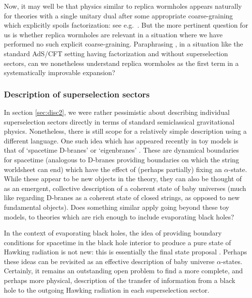 \documentclass[letterpaper,12pt]{article}
\begin{document}
Now, it may well be that physics similar to replica wormholes appears naturally for theories with a single unitary dual after some appropriate coarse-graining which explicitly spoils factorization: see e.g.\ \cite{Pollack:2020gfa,Liu:2020jsv,VanRaamsdonk:2020tlr}. But the more pertinent question for us is whether replica wormholes are relevant in a situation where we have performed no such explicit coarse-graining. Paraphrasing \cite{Stanford:2020wkf}, in a situation like the standard AdS/CFT setting having factorization and without superselection sectors, can we nonetheless understand replica wormholes as the first term in a systematically improvable expansion?

\subsubsection{Description of superselection sectors}
\label{sec:ebranes}

In section \ref{sec:disc2}, we were rather pessimistic about describing individual superselection sectors directly in terms of standard semiclassical gravitational physics. Nonetheless, there is still scope for a relatively simple description using a different language. One such idea which has appeared recently in toy models is that of `spacetime D-branes' or  `eigenbranes' \cite{Blommaert:2019wfy,Blommaert:2020seb,Saad:2019lba,Marolf:2020xie}. These are dynamical boundaries for spacetime (analogous to D-branes providing boundaries on which the string worldsheet can end) which have the effect of (perhaps partially) fixing an $\alpha$-state. While these appear to be new objects in the theory, they can also be thought of as an emergent, collective description of a coherent state of baby universes (much like regarding D-branes as a coherent state of closed strings, as opposed to new fundamental objects). Does something similar apply going beyond these toy models, to theories which are rich enough to include evaporating black holes?

In the context of evaporating black holes, the idea of providing boundary conditions for spacetime in the black hole interior to produce a pure state of Hawking radiation is not new: this is essentially the final state proposal \cite{Horowitz:2003he}. Perhaps these ideas can be revisited as an effective description of baby universe $\alpha$-states. Certainly, it remains an outstanding open problem to find a more complete, and perhaps more physical, description of the transfer of information from a black hole to the outgoing Hawking radiation in each superselection sector.
\end{document}
